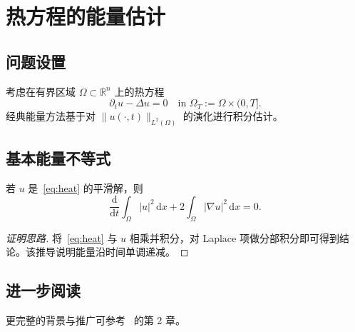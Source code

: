 \documentclass[../../main.tex]{subfiles}
\begin{document}
\chapter{热方程的能量估计}

\section{问题设置}
考虑在有界区域 $\Omega \subset \mathbb{R}^n$ 上的热方程
\begin{equation}
  \label{eq:heat}
  \partial_t u - \Delta u = 0 \quad \text{in } \Omega_T := \Omega \times (0,T].
\end{equation}
经典能量方法基于对 $\|u(\cdot,t)\|_{L^2(\Omega)}$ 的演化进行积分估计。

\section{基本能量不等式}
\begin{theorem}[能量衰减]
  若 $u$ 是~\cref{eq:heat} 的平滑解，则
  \[
    \frac{\mathrm{d}}{\mathrm{d}t} \int_{\Omega} |u|^2 \,\mathrm{d}x + 2 \int_{\Omega} |\nabla u|^2 \,\mathrm{d}x = 0.
  \]
\end{theorem}
\begin{proof}[证明思路]
  将~\cref{eq:heat} 与 $u$ 相乘并积分，对 Laplace 项做分部积分即可得到结论。该推导说明能量沿时间单调递减。
\end{proof}

\section{进一步阅读}
更完整的背景与推广可参考~\cite{evans2010} 的第 2 章。

\printbibliography[heading=subbibliography]
\end{document}
